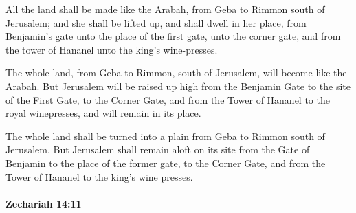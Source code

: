 			\begin{versebox}
					\item[BHS] 
					\item[LXX] 
					\item[ASV] All the land shall be made like the Arabah, from Geba to Rimmon south of Jerusalem; and she shall be lifted up, and shall dwell in her place, from Benjamin's gate unto the place of the first gate, unto the corner gate, and from the tower of Hananel unto the king's wine-presses.
					\item[NIV] The whole land, from Geba to Rimmon, south of Jerusalem, will become like the Arabah. But Jerusalem will be raised up high from the Benjamin Gate to the site of the First Gate, to the Corner Gate, and from the Tower of Hananel to the royal winepresses, and will remain in its place.
					\item[NRSV] The whole land shall be turned into a plain from Geba to Rimmon south of Jerusalem. But Jerusalem shall remain aloft on its site from the Gate of Benjamin to the place of the former gate, to the Corner Gate, and from the Tower of Hananel to the king’s wine presses.
			\end{versebox}

		\paragraph{Zechariah 14:11} %
			\label{ZECHARIAH-14-11}

